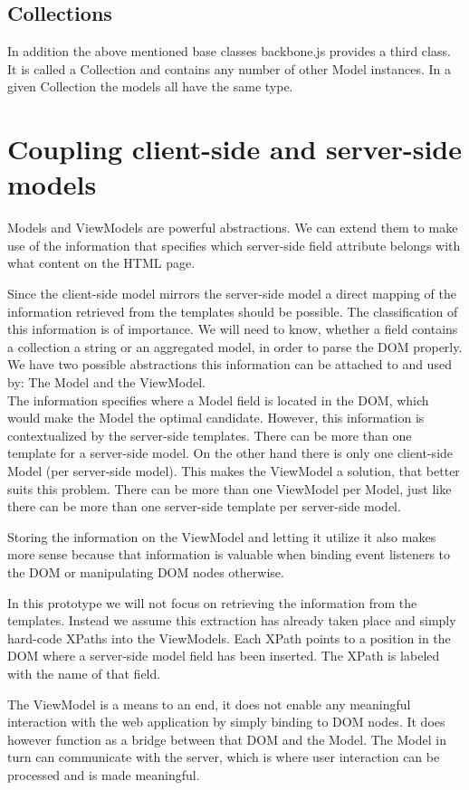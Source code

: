 \subsection{Collections}
In addition the above mentioned base classes backbone.js provides a third class.
It is called a Collection and contains any number of other Model instances.
In a given Collection the models all have the same type.

\section{Coupling client-side and server-side models}
Models and ViewModels are powerful abstractions.
We can extend them to make use of the information that specifies
which server-side field attribute belongs with what content on the HTML page.

Since the client-side model mirrors the server-side model a direct mapping of
the information retrieved from the templates should be possible.
The classification of this information is of importance. We will need to know,
whether a field contains a collection a string or an aggregated model, in order
to parse the DOM properly.
We have two possible abstractions this information can be attached to and
used by: The Model and the ViewModel.\\
The information specifies where a Model field is located in the DOM, which would
make the Model the optimal candidate. However, this information is
contextualized by the server-side templates. There can be more than one template
for a server-side model. On the other hand there is only one client-side Model
(per server-side model).
This makes the ViewModel a solution, that better suits this problem.
There can be more than one ViewModel per Model, just like there can be more than
one server-side template per server-side model.

Storing the information on the ViewModel and letting it utilize it also makes
more sense because that information is valuable when binding event listeners
to the DOM or manipulating DOM nodes otherwise.

In this prototype we will not focus on retrieving the information from
the templates. Instead we assume this extraction has already taken place and
simply hard-code XPaths into the ViewModels. Each XPath points to a
position in the DOM where a server-side model field has been inserted.
The XPath is labeled with the name of that field.

The ViewModel is a means to an end, it does not enable any meaningful
interaction with the web application by simply binding to DOM nodes.
It does however function as a bridge between that DOM and the Model.
The Model in turn can communicate with the server, which is where user
interaction can be processed and is made meaningful.

